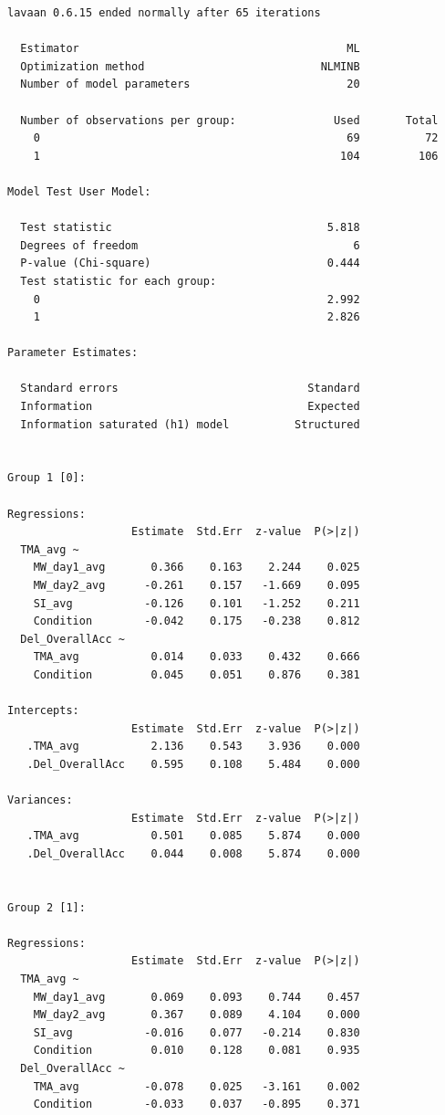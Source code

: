 \documentclass[
  letterpaper,
  DIV=11,
  numbers=noendperiod]{scrartcl}
\begin{document}
\begin{verbatim}
lavaan 0.6.15 ended normally after 65 iterations

  Estimator                                         ML
  Optimization method                           NLMINB
  Number of model parameters                        20

  Number of observations per group:               Used       Total
    0                                               69          72
    1                                              104         106

Model Test User Model:
                                                      
  Test statistic                                 5.818
  Degrees of freedom                                 6
  P-value (Chi-square)                           0.444
  Test statistic for each group:
    0                                            2.992
    1                                            2.826

Parameter Estimates:

  Standard errors                             Standard
  Information                                 Expected
  Information saturated (h1) model          Structured


Group 1 [0]:

Regressions:
                   Estimate  Std.Err  z-value  P(>|z|)
  TMA_avg ~                                           
    MW_day1_avg       0.366    0.163    2.244    0.025
    MW_day2_avg      -0.261    0.157   -1.669    0.095
    SI_avg           -0.126    0.101   -1.252    0.211
    Condition        -0.042    0.175   -0.238    0.812
  Del_OverallAcc ~                                    
    TMA_avg           0.014    0.033    0.432    0.666
    Condition         0.045    0.051    0.876    0.381

Intercepts:
                   Estimate  Std.Err  z-value  P(>|z|)
   .TMA_avg           2.136    0.543    3.936    0.000
   .Del_OverallAcc    0.595    0.108    5.484    0.000

Variances:
                   Estimate  Std.Err  z-value  P(>|z|)
   .TMA_avg           0.501    0.085    5.874    0.000
   .Del_OverallAcc    0.044    0.008    5.874    0.000


Group 2 [1]:

Regressions:
                   Estimate  Std.Err  z-value  P(>|z|)
  TMA_avg ~                                           
    MW_day1_avg       0.069    0.093    0.744    0.457
    MW_day2_avg       0.367    0.089    4.104    0.000
    SI_avg           -0.016    0.077   -0.214    0.830
    Condition         0.010    0.128    0.081    0.935
  Del_OverallAcc ~                                    
    TMA_avg          -0.078    0.025   -3.161    0.002
    Condition        -0.033    0.037   -0.895    0.371


\end{verbatim}
\end{document}
